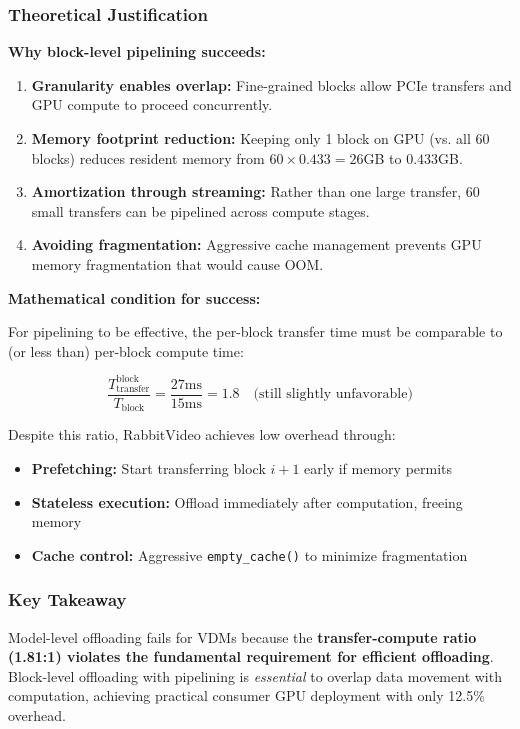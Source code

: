 \subsubsection{Theoretical Justification}

\textbf{Why block-level pipelining succeeds:}

\begin{enumerate}
    \item \textbf{Granularity enables overlap:} Fine-grained blocks allow PCIe transfers and GPU compute to proceed concurrently.

    \item \textbf{Memory footprint reduction:} Keeping only 1 block on GPU (vs. all 60 blocks) reduces resident memory from $60 \times 0.433 = 26$GB to $0.433$GB.

    \item \textbf{Amortization through streaming:} Rather than one large transfer, 60 small transfers can be pipelined across compute stages.

    \item \textbf{Avoiding fragmentation:} Aggressive cache management prevents GPU memory fragmentation that would cause OOM.
\end{enumerate}

\textbf{Mathematical condition for success:}

For pipelining to be effective, the per-block transfer time must be comparable to (or less than) per-block compute time:

\begin{equation}
\frac{T_{\text{transfer}}^{\text{block}}}{T_{\text{block}}} = \frac{27\text{ms}}{15\text{ms}} = 1.8 \quad \text{(still slightly unfavorable)}
\label{eq:pipeline_condition}
\end{equation}

Despite this ratio, RabbitVideo achieves low overhead through:
\begin{itemize}
    \item \textbf{Prefetching:} Start transferring block $i+1$ early if memory permits
    \item \textbf{Stateless execution:} Offload immediately after computation, freeing memory
    \item \textbf{Cache control:} Aggressive \texttt{empty\_cache()} to minimize fragmentation
\end{itemize}

\subsubsection{Key Takeaway}

Model-level offloading fails for VDMs because the \textbf{transfer-compute ratio (1.81:1) violates the fundamental requirement for efficient offloading}. Block-level offloading with pipelining is \textit{essential} to overlap data movement with computation, achieving practical consumer GPU deployment with only 12.5\% overhead.

